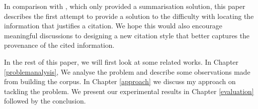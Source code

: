 In comparison with \cite{csibs}, which only provided a summarisation solution, this paper describes the first attempt to provide a solution to the difficulty with locating the information that justifies a citation. We hope this would also encourage meaningful discussions to designing a new citation style that better captures the provenance of the cited information.

In the rest of this paper, we will first look at some related works. In Chapter \ref{problemanalysis}, We analyse the problem and describe some observations made from building the corpus. In Chapter \ref{approach} we discuss my approach on tackling the problem. We present our experimental results in Chapter \ref{evaluation} followed by the conclusion.
